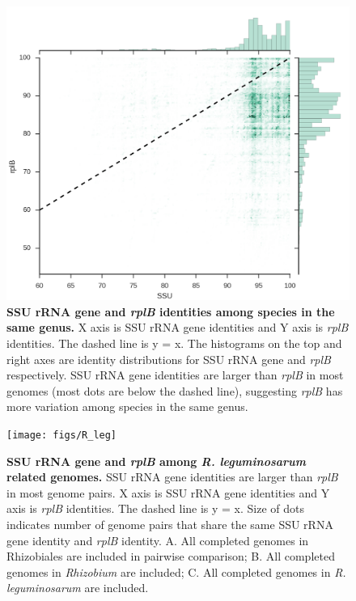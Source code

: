 \documentclass[]{msu-thesis}
\begin{document}
\begin{figure}[tbph!]
  \centering
  \includegraphics[width=1.0\textwidth]{figs/inter_species_comp}
  \caption[SSU rRNA gene and \textit{rplB} identities among species in the same genus]{\textbf{SSU rRNA gene and \textit{rplB} identities among species in the same genus.} X axis is SSU rRNA gene identities and Y axis is \textit{rplB} identities. The dashed line is y = x. The histograms on the top and right axes are identity distributions for SSU rRNA gene and \textit{rplB} respectively. SSU rRNA gene identities are larger than \textit{rplB} in most genomes (most dots are below the dashed line), suggesting \textit{rplB} has more variation among species in the same genus.}
  \label{fig:interSpeciesComp}
\end{figure}


\begin{figure}[tbph!]
  \centering
  \texttt{[image: figs/R\_leg]}
  \caption[SSU rRNA gene and \textit{rplB} identities among \textit{R. leguminosarum} related genomes]{\textbf{SSU rRNA gene and \textit{rplB} among \textit{R. leguminosarum} related genomes.} SSU rRNA gene identities are larger than \textit{rplB} in most genome pairs. X axis is SSU rRNA gene identities and Y axis is \textit{rplB} identities. The dashed line is y = x. Size of dots indicates number of genome pairs that share the same SSU rRNA gene identity and \textit{rplB} identity. A. All completed genomes in Rhizobiales are included in pairwise comparison; B. All completed genomes in \textit{\textit{Rhizobium}} are included; C. All completed genomes in \textit{R. leguminosarum} are included.}
  \label{fig:RLeg}
\end{figure}
\end{document}
